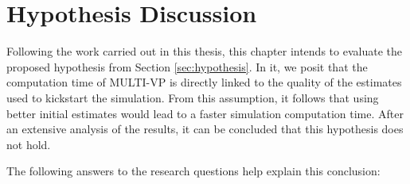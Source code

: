 \chapter{Hypothesis Discussion}\label{chap:hypothesis_disc}
Following the work carried out in this thesis, this chapter intends to evaluate the proposed hypothesis from Section \ref{sec:hypothesis}. In it, we posit that the computation time of MULTI-VP is directly linked to the quality of the estimates used to kickstart the simulation. From this assumption, it follows that using better initial estimates would lead to a faster simulation computation time. After an extensive analysis of the results, it can be concluded that this hypothesis does not hold.

The following answers to the research questions help explain this conclusion:

